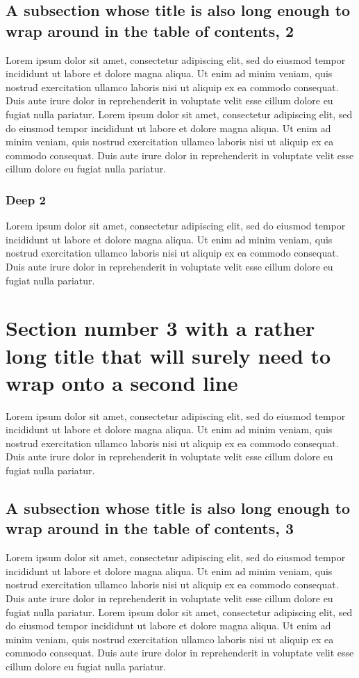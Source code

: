 \documentclass[11pt]{article}
\begin{document}
\subsection{A subsection whose title is also long enough to wrap around in the table of contents, 2}
Lorem ipsum dolor sit amet, consectetur adipiscing elit, sed do eiusmod tempor incididunt ut labore et dolore magna aliqua. Ut enim ad minim veniam, quis nostrud exercitation ullamco laboris nisi ut aliquip ex ea commodo consequat. Duis aute irure dolor in reprehenderit in voluptate velit esse cillum dolore eu fugiat nulla pariatur. Lorem ipsum dolor sit amet, consectetur adipiscing elit, sed do eiusmod tempor incididunt ut labore et dolore magna aliqua. Ut enim ad minim veniam, quis nostrud exercitation ullamco laboris nisi ut aliquip ex ea commodo consequat. Duis aute irure dolor in reprehenderit in voluptate velit esse cillum dolore eu fugiat nulla pariatur.

\subsubsection{Deep 2}
Lorem ipsum dolor sit amet, consectetur adipiscing elit, sed do eiusmod tempor incididunt ut labore et dolore magna aliqua. Ut enim ad minim veniam, quis nostrud exercitation ullamco laboris nisi ut aliquip ex ea commodo consequat. Duis aute irure dolor in reprehenderit in voluptate velit esse cillum dolore eu fugiat nulla pariatur.

\section{Section number 3 with a rather long title that will surely need to wrap onto a second line}
Lorem ipsum dolor sit amet, consectetur adipiscing elit, sed do eiusmod tempor incididunt ut labore et dolore magna aliqua. Ut enim ad minim veniam, quis nostrud exercitation ullamco laboris nisi ut aliquip ex ea commodo consequat. Duis aute irure dolor in reprehenderit in voluptate velit esse cillum dolore eu fugiat nulla pariatur.

\subsection{A subsection whose title is also long enough to wrap around in the table of contents, 3}
Lorem ipsum dolor sit amet, consectetur adipiscing elit, sed do eiusmod tempor incididunt ut labore et dolore magna aliqua. Ut enim ad minim veniam, quis nostrud exercitation ullamco laboris nisi ut aliquip ex ea commodo consequat. Duis aute irure dolor in reprehenderit in voluptate velit esse cillum dolore eu fugiat nulla pariatur. Lorem ipsum dolor sit amet, consectetur adipiscing elit, sed do eiusmod tempor incididunt ut labore et dolore magna aliqua. Ut enim ad minim veniam, quis nostrud exercitation ullamco laboris nisi ut aliquip ex ea commodo consequat. Duis aute irure dolor in reprehenderit in voluptate velit esse cillum dolore eu fugiat nulla pariatur.
\end{document}
